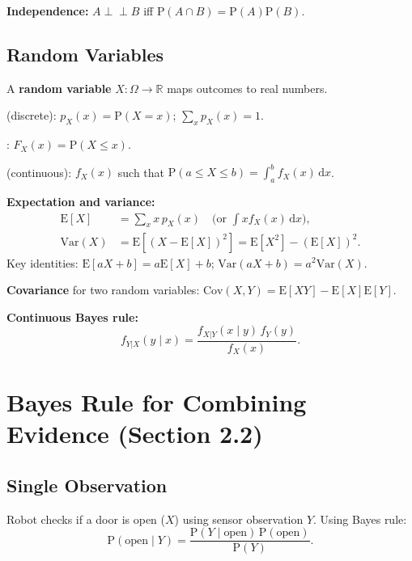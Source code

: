 \documentclass[12pt, a4paper]{article}
\begin{document}
\textbf{Independence:} $A\perp\!\!\!\perp B$ iff $\mathrm{P}(A\cap B)=\mathrm{P}(A)\mathrm{P}(B)$.

\subsection{Random Variables}

A \textbf{random variable} $X:\Omega\to\mathbb{R}$ maps outcomes to real
numbers.

\begin{description}[leftmargin=2em]
  \item[PMF] (discrete): $p_X(x)=\mathrm{P}(X=x)$; $\sum_x p_X(x)=1$.
  \item[CDF]: $F_X(x)=\mathrm{P}(X\le x)$.
  \item[PDF] (continuous): $f_X(x)$ such that $\mathrm{P}(a\le X\le b)=\int_a^b f_X(x)\,\mathrm{d}x$.
\end{description}

\textbf{Expectation and variance:}
\begin{align}
  \mathrm{E}[X] &= \sum_x x\,p_X(x) \quad\text{(or } \int xf_X(x)\,\mathrm{d}x\text{)}, \\
  \mathrm{Var}(X) &= \mathrm{E}[(X-\mathrm{E}[X])^2] = \mathrm{E}[X^2]-(\mathrm{E}[X])^2.
\end{align}
Key identities: $\mathrm{E}[aX+b]=a\mathrm{E}[X]+b$; $\mathrm{Var}(aX+b)=a^2\mathrm{Var}(X)$.

\textbf{Covariance} for two random variables: $\mathrm{Cov}(X,Y)=\mathrm{E}[XY]-\mathrm{E}[X]\mathrm{E}[Y]$.

\textbf{Continuous Bayes rule:}
\begin{equation}
  f_{Y|X}(y\mid x) = \frac{f_{X|Y}(x\mid y)\,f_Y(y)}{f_X(x)}.
\end{equation}

\section{Bayes Rule for Combining Evidence (Section 2.2)}

\subsection{Single Observation}

Robot checks if a door is open ($X$) using sensor observation $Y$.
Using Bayes rule:
\begin{equation}
  \mathrm{P}(\text{open}\mid Y) = \frac{\mathrm{P}(Y\mid\text{open})\,\mathrm{P}(\text{open})}{\mathrm{P}(Y)}.
\end{equation}
\end{document}
